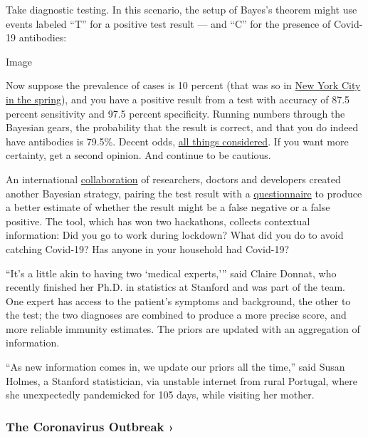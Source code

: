 Take diagnostic testing. In this scenario, the setup of Bayes's theorem
might use events labeled ``T'' for a positive test result --- and ``C''
for the presence of Covid-19 antibodies:

Image

Now suppose the prevalence of cases is 10 percent (that was so in
\href{https://dash.harvard.edu/bitstream/handle/1/42665370/Kissler_etal_NYC_mobility.pdf?sequence=1\&isAllowed=y}{New
York City in the spring}), and you have a positive result from a test
with accuracy of 87.5 percent sensitivity and 97.5 percent specificity.
Running numbers through the Bayesian gears, the probability that the
result is correct, and that you do indeed have antibodies is 79.5\%.
Decent odds,
\href{https://www.nytimes.com/2020/07/26/health/coronvirus-antibody-tests.html?searchResultPosition=1}{all
things considered}. If you want more certainty, get a second opinion.
And continue to be cautious.

An international \href{https://arxiv.org/abs/2007.13847}{collaboration}
of researchers, doctors and developers created another Bayesian
strategy, pairing the test result with a
\href{http://homecovidtests.org}{questionnaire} to produce a better
estimate of whether the result might be a false negative or a false
positive. The tool, which has won two hackathons, collects contextual
information: Did you go to work during lockdown? What did you do to
avoid catching Covid-19? Has anyone in your household had Covid-19?

``It's a little akin to having two `medical experts,''' said Claire
Donnat, who recently finished her Ph.D. in statistics at Stanford and
was part of the team. One expert has access to the patient's symptoms
and background, the other to the test; the two diagnoses are combined to
produce a more precise score, and more reliable immunity estimates. The
priors are updated with an aggregation of information.

``As new information comes in, we update our priors all the time,'' said
Susan Holmes, a Stanford statistician, via unstable internet from rural
Portugal, where she unexpectedly pandemicked for 105 days, while
visiting her mother.

\href{https://www.nytimes.com/news-event/coronavirus?action=click\&pgtype=Article\&state=default\&region=MAIN_CONTENT_3\&context=storylines_faq}{}

\hypertarget{the-coronavirus-outbreak-}{%
\subsubsection{The Coronavirus Outbreak
›}\label{the-coronavirus-outbreak-}}

